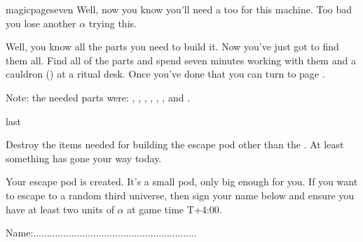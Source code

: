 \documentclass[greennotebook]{guildcamp3} %
\begin{document}
\begin{page}{magicpageseven}
	Well, now you know you'll need a \iUnicornHoof{} too for this machine. Too bad you lose another $\alpha$ trying this. 	
	
	Well, you know all the parts you need to build it. Now you've just got to find them all. Find all of the parts and spend seven minutes working with them and a cauldron (\iCauldron{}) at a ritual desk. Once you've done that you can turn to page . 
	
	Note: the needed parts were: \iUnicornHoof{}, \iDragonSkin{}, \iBelladonna{}, \iHolyWater{}, \iWerewolfFang{}, \iStardust{}, and \iSalamander{}. 
\end{page}

\begin{page}{last}

Destroy the items needed for building the escape pod other than the \iCauldron{}. At least something has gone your way today. 

Your escape pod is created. It's a small pod, only big enough for you. If you want to escape to a random third universe, then sign your name below and ensure you have at least two units of $\alpha$ at game time T+4:00. 

Name:............................................................

\end{page}



\endnotebook
\end{document}
